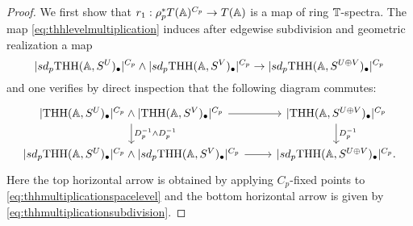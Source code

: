 \begin{proof}
We first show that $r_1:\rho_p^\ast T(\mathbb{A})^{C_p}\to T(\mathbb{A})$ is a map of ring $\mathbb{T}$-spectra. 
The map \eqref{eq:thhlevelmultiplication} induces after edgewise subdivision
and geometric realization a map
\begin{equation}\label{eq:thhmultiplicationsubdivision}
\lvert sd_p\mathrm{THH}(\mathbb{A},S^U)_\bullet\rvert ^{C_p}\wedge \lvert sd_p\mathrm{THH}(\mathbb{A},S^V)_\bullet\rvert ^{C_p}\to
\lvert sd_p\mathrm{THH}(\mathbb{A},S^{U\oplus V})_\bullet\rvert ^{C_p}
\end{equation}
and one verifies  by direct inspection that the following diagram commutes:
\begin{equation}\label{eq:restrictionmultiplication1}
\begin{tikzcd}
\lvert \mathrm{THH}(\A,S^U)_\bullet\rvert ^{C_p}\wedge \lvert \mathrm{THH}(\A,S^V)_\bullet\rvert ^{C_p}
\arrow{r}\arrow{d}{D_p^{-1} \wedge D_p^{-1}}
&\lvert \mathrm{THH}(\A,S^{U\oplus V})_\bullet\rvert ^{C_p}
\arrow{d}{D^{-1}_p}\\
\lvert sd_p\mathrm{THH}(\A,S^U)_\bullet\rvert ^{C_p}\wedge \lvert sd_p\mathrm{THH}(\A,S^V)_\bullet\rvert ^{C_p}
\arrow{r}
&\lvert sd_p\mathrm{THH}(\A,S^{U\oplus V})_\bullet\rvert ^{C_p}.
\end{tikzcd}
\end{equation}
Here the top horizontal arrow is obtained by applying $C_p$-fixed points
to \ref{eq:thhmultiplicationspacelevel} and the bottom horizontal arrow is given by \ref{eq:thhmultiplicationsubdivision}.


\end{proof}
